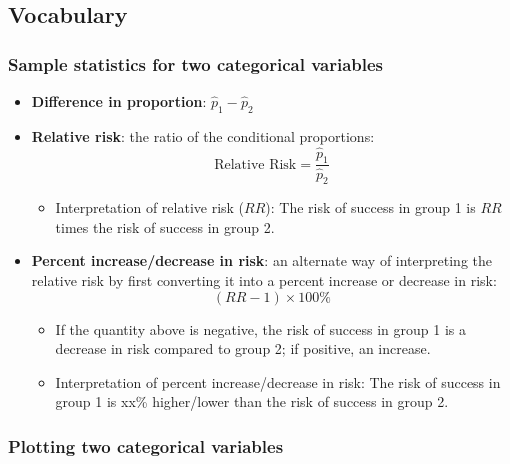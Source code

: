 \documentclass[
]{report}
\providecommand{\tightlist}{%
  \setlength{\itemsep}{0pt}\setlength{\parskip}{0pt}}
\begin{document}
\subsection{Vocabulary}\label{vocabulary-6}

\subsubsection*{Sample statistics for two categorical variables}\label{sample-statistics-for-two-categorical-variables}

\begin{itemize}
\item
  \textbf{Difference in proportion}: \(\hat{p}_1 - \hat{p}_2\)
\item
  \textbf{Relative risk}: the ratio of the conditional proportions:
  \[\text{Relative Risk} = \frac{\hat{p}_1}{\hat{p}_2}\]

  \begin{itemize}
  \tightlist
  \item
    Interpretation of relative risk (\(RR\)): The risk of success in group 1 is \(RR\) times the risk of success in group 2.
  \end{itemize}
\item
  \textbf{Percent increase/decrease in risk}: an alternate way of interpreting the relative risk by first converting it into a percent increase or decrease in risk:
  \[(RR-1) \times 100\%\]

  \begin{itemize}
  \tightlist
  \item
    If the quantity above is negative, the risk of success in group 1 is a decrease in risk compared to group 2; if positive, an increase.\\
  \item
    Interpretation of percent increase/decrease in risk: The risk of success in group 1 is xx\% higher/lower than the risk of success in group 2.
  \end{itemize}
\end{itemize}

\subsubsection*{Plotting two categorical variables}\label{plotting-two-categorical-variables}
\end{document}
